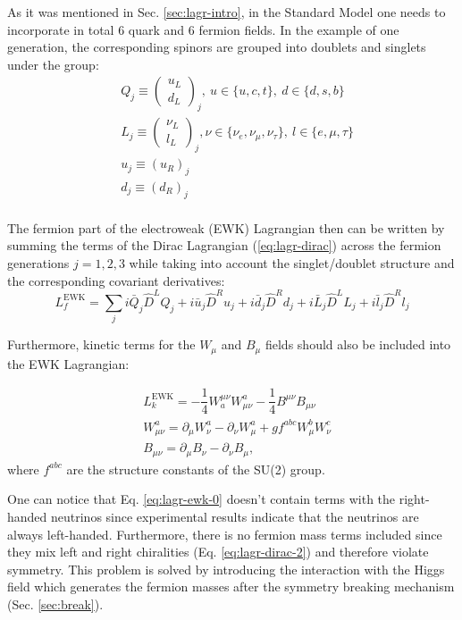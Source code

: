 As it was mentioned in Sec. \ref{sec:lagr-intro}, in the Standard Model one needs to incorporate in total 6 quark and 6 fermion fields. In the example of one generation, the corresponding spinors are grouped into doublets and singlets under the \sutwo group:
\begin{align}\label{eq:ferm-notation}
    &Q_j \equiv \left(\begin{matrix} u_L \\ d_L \end{matrix}\right)_j, ~u \in \{u, c, t\}, ~d \in \{d, s, b\}\\
    &L_j \equiv \left(\begin{matrix} \nu_L \\ l_L \end{matrix}\right)_j, \nu \in \{\nu_{e}, \nu_{\mu}, \nu_{\tau}\}, ~l \in \{e, \mu, \tau\}\\
    &u_j \equiv (u_R)_j\\
    &d_j \equiv (d_R)_j\\
\end{align}

The fermion part of the electroweak (EWK) Lagrangian then can be written by summing the terms of the Dirac Lagrangian (\ref{eq:lagr-dirac}) across the fermion generations $j = 1,2,3$ while taking into account the \sutwo singlet/doublet structure and the corresponding covariant derivatives:
\begin{equation}\label{eq:lagr-ewk-0}
    L_f^\text{EWK} = \sum_j i\bar{Q}_j\hat{D}^L Q_j + i\bar{u}_j\hat{D}^R u_j + i\bar{d}_j\hat{D}^R d_j + i\bar{L}_j\hat{D}^L L_j + i\bar{l}_j\hat{D}^R l_j
\end{equation}

Furthermore, kinetic terms for the $W_\mu$ and $B_\mu$ fields should also be included into the EWK Lagrangian:

\begin{align}
    &L_k^\text{EWK} = -\dfrac{1}{4}W_a^{\mu\nu}W^a_{\mu\nu}-\dfrac{1}{4}B^{\mu\nu}B_{\mu\nu}\\
    &W^a_{\mu\nu} = \partial_\mu W^a_\nu - \partial_\nu W^a_\mu +gf^{abc}W^b_\mu W^c_\nu\\
    &B_{\mu\nu} = \partial_\mu B_\nu - \partial_\nu B_\mu,
\end{align}
where $f^{abc}$ are the structure constants of the SU(2) group.

One can notice that Eq. \ref{eq:lagr-ewk-0} doesn't contain terms with the right-handed neutrinos since experimental results indicate that the neutrinos are always left-handed. Furthermore, there is no fermion mass terms included since they mix left and right chiralities (Eq. \ref{eq:lagr-dirac-2}) and therefore violate \sutwo symmetry. This problem is solved by introducing the interaction with the Higgs field which generates the fermion masses after the symmetry breaking mechanism (Sec. \ref{sec:break}). 

